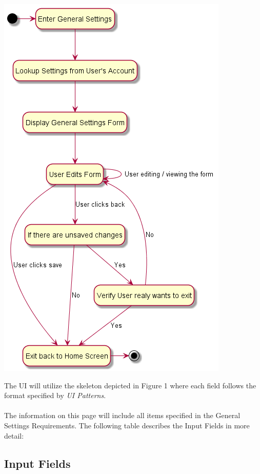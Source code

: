 \documentclass{scrreprt}
\begin{document}
\begin{center}
\includegraphics[scale=0.5]{settings.png}
\end{center}
The UI will utilize the skeleton depicted in Figure 1 where each field follows the format specified by \textit{UI Patterns}.
\\\\
The information on this page will include all items specified in the General Settings Requirements.  The following table describes the Input Fields in more detail:

\subsection{Input Fields}
\end{document}

